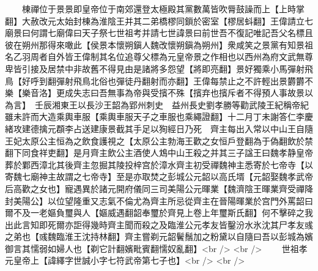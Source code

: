 　　棟禪位于景景即皇帝位于南郊還登太極殿其黨數萬皆吹脣鼓譟而上【上時掌翻】大赦改元太始封棟為淮陰王并其二弟橋樛同鎻於密室【樛居蚪翻】王偉請立七廟景曰何謂七廟偉曰天子祭七世祖考并請七世諱景曰前世吾不復記唯記吾父名標且彼在朔州那得來噉此【侯景本懷朔鎭人魏改懷朔鎭為朔州】衆咸笑之景黨有知景祖名乙羽周者自外皆王偉制其名位追尊父標為元皇帝景之作相也以西州為府文武無尊卑皆引接及居禁中非故舊不得見由是諸將多怨望【將即亮翻】景好獨乘小馬彈射飛鳥【好呼到翻彈射飛鳥北俗也彈徒丹翻射而亦翻】王偉每禁止之不許輕出景欝欝不樂【樂音洛】更成失志曰吾無事為帝與受擯不殊【擯弃也擯斥者不得預人事故景以為言】　壬辰湘東王以長沙王韶為郢州刺史　益州長史劉孝勝等勸武陵王紀稱帝紀雖未許而大造乘輿車服【乘輿車服天子之車服也乘繩證翻】十二月丁未謝答仁李慶緒攻建德擒元頵李占送建康景截其手足以狥經日乃死　齊主每出入常以中山王自隨王妃太原公主恒為之飲食護視之【太原公主勃海王歡之女恒戶登翻為于偽翻飲於禁翻下同食祥吏翻】是月齊主飲公主酒使人鴆中山王殺之并其三子諡王曰魏孝静皇帝葬於鄴西漳北其後齊主忽掘其陵投梓宫於漳水齊主初受禪魏神主悉寄於七帝寺【以寄魏七廟神主故謂之七帝寺】至是亦取焚之彭城公元韶以高氏壻【元韶娶魏孝武帝后高歡之女也】寵遇異於諸元開府儀同三司美陽公元暉業【魏濟陰王暉業齊受禪降封美陽公】以位望隆重又志氣不倫尤為齊主所忌從齊主在晉陽暉業於宫門外罵韶曰爾不及一老嫗負璽與人【嫗威遇翻韶奉璽於齊見上卷上年璽斯氏翻】何不擊碎之我出此言知即死爾亦詎得幾時齊主聞而殺之及臨淮公元孝友皆鑿汾水氷沈其尸孝友彧之弟也【彧魏臨淮王沈持林翻】齊主嘗剃元韶鬢鬚加之粉黛以自隨曰吾以彭城為嬪御言其懦弱如婦人也【剃它計翻嬪毗賓翻懦奴亂翻】<br />
<br />
　　世祖孝元皇帝上【諱繹字世誠小字七符武帝第七子也】<br />
<br />
